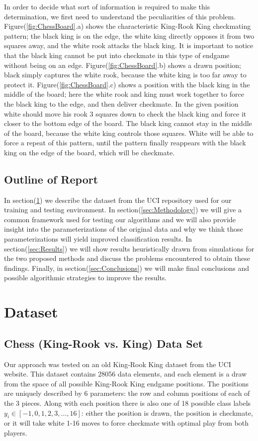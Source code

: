 \documentclass[fleqn]{article}
\begin{document}
In order to decide what sort of information is required to make this determination, we first need to understand the peculiarities of this problem. Figure(\ref{fig:ChessBoard}.a) shows the characteristic King-Rook King checkmating pattern; the black king is on the edge, the white king directly opposes it from two squares away, and the white rook attacks the black king. It is important to notice that the black king cannot be put into checkmate in this type of endgame without being on an edge. Figure(\ref{fig:ChessBoard}.b) shows a drawn position; black simply captures the white rook, because the white king is too far away to protect it. Figure(\ref{fig:ChessBoard}.c) shows a position with the black king in the middle of the board; here the white rook and king must work together to force the black king to the edge, and then deliver checkmate. In the given position white should move his rook 3 squares down to check the black king and force it closer to the bottom edge of the board. The black king cannot stay in the middle of the board, because the white king controls those squares. White will be able to force a repeat of this pattern, until the pattern finally reappears with the black king on the edge of the board, which will be checkmate.
%
\subsection{Outline of Report}
\label{subsec:outline}
In section(\ref{sec:Dataset}) we describe the dataset from the UCI repository used for our training and testing environment.  In section(\ref{sec:Methodology}) we will give a common framework used for testing our algorithms and we will also provide insight into the parameterizations of the original data and why we think those parameterizations will yield improved classification results.  In section(\ref{sec:Results}) we will show results heuristically drawn from simulations for the two proposed methods and discuss the problems encountered to obtain these findings.  Finally, in section(\ref{sec:Conclusions}) we will make final conclusions and possible algorithmic strategies to improve the results. 

\section{Dataset}
\label{sec:Dataset}

\subsection{Chess (King-Rook vs. King) Data Set}
\label{subsec:dataset}
Our approach was tested on an old King-Rook King dataset from the UCI website\cite{MichaelBain:1994}. This dataset contains 28056 data elements, and each element is a draw from the space of all possible King-Rook King endgame positions. The positions are uniquely described by 6 parameters: the row and column positions of each of the 3 pieces. Along with each position there is also one of 18 possible class labels $y_i \in [-1,0,1,2,3,\dots,16]$: either the position is drawn, the position is checkmate, or it will take white 1-16 moves to force checkmate with optimal play from both players.
\end{document}
